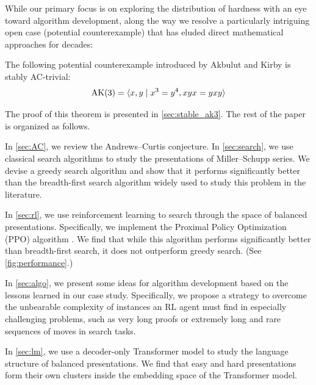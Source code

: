 While our primary focus is on exploring the distribution of hardness with an eye toward algorithm development, along the way we resolve a particularly intriguing open case (potential counterexample) that has eluded direct mathematical approaches for decades:

\begin{theorem}\label{thm:stableAK3}
The following potential counterexample introduced by Akbulut and Kirby \cite{Akbulut--Kirby} is stably AC-trivial:
\[
\text{AK}(3) = \langle x, y \mid x^3 = y^{4}, xyx = yxy\rangle
\]
\end{theorem}

\noindent
The proof of this theorem is presented in \autoref{sec:stable_ak3}.
%
The rest of the paper is organized as follows.


In \autoref{sec:AC}, we review the Andrews--Curtis conjecture. In \autoref{sec:search}, we use classical search algorithms to study the presentations of Miller--Schupp series. We devise a greedy search algorithm and show that it performs significantly better than the breadth-first search algorithm widely used to study this problem in the literature.

In \autoref{sec:rl}, we use reinforcement learning to search through the space of balanced presentations. Specifically, we implement the Proximal Policy Optimization (PPO) algorithm \cite{schulman2017proximal}. We find that while this algorithm performs significantly better than breadth-first search, it does not outperform greedy search. (See \autoref{fig:performance}.)

In \autoref{sec:algo}, we present some ideas for algorithm development based on the lessons learned in our case study. Specifically, we propose a strategy to overcome the unbearable complexity of instances an RL agent must find in especially challenging problems, such as very long proofs or extremely long and rare sequences of moves in search tasks.

In \autoref{sec:lm}, we use a decoder-only Transformer model to study the language structure of balanced presentations. We find that easy and hard presentations form their own clusters inside the embedding space of the Transformer model.

